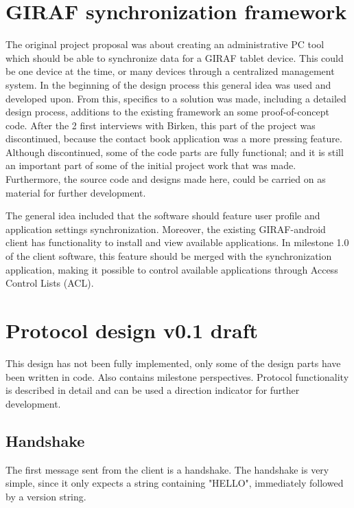 \section{GIRAF synchronization framework}
The original project proposal was about creating an administrative PC tool which should be able to synchronize data for a GIRAF tablet device. This could be one device at the time, or many devices through a centralized management system. In the beginning of the design process this general idea was used and developed upon. From this, specifics to a solution was made, including a detailed design process, additions to the existing framework an some proof-of-concept code. After the 2 first interviews with Birken, this part of the project was discontinued, because the contact book application was a more pressing feature. Although discontinued, some of the code parts are fully functional; and it is still an important part of some of the initial project work that was made. Furthermore, the source code and designs made here, could be carried on as material for further development. 

The general idea included that the software should feature user profile and application settings synchronization. Moreover, the existing GIRAF-android client has functionality to install and view available applications. In milestone 1.0 of the client software, this feature should be merged with the synchronization application, making it possible to control available applications through Access Control Lists (ACL). 


\section{Protocol design v0.1 draft}
This design has not been fully implemented, only some of the design parts have been written in code. Also contains milestone perspectives. Protocol functionality is described in detail and can be used a direction indicator for further development.   

\subsection{Handshake}
The first message sent from the client is a handshake. The handshake is very simple, since it only expects a string containing "HELLO", immediately followed by a version string.


